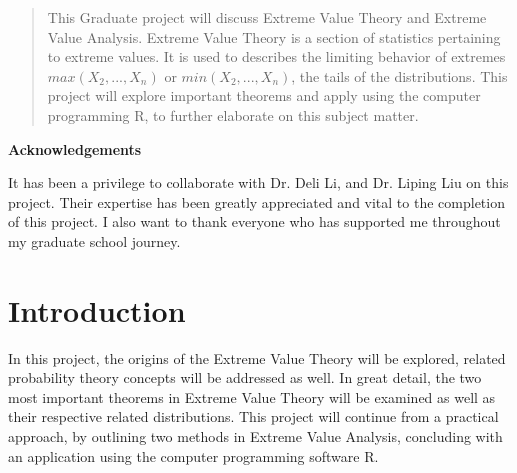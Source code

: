 \documentclass[11pt,a4paper]{article}
\theoremstyle{plain}
\begin{document}


\newpage

\begin{abstract}

This Graduate project will discuss Extreme Value Theory and Extreme Value Analysis. Extreme Value Theory is a section of statistics pertaining to extreme values. It is used to describes the limiting behavior of extremes $max(X_2,...,X_n)$ or $min(X_2,...,X_n)$, the tails of the distributions. This project will explore important theorems and apply using the computer programming R, to further elaborate on this subject matter.  
\end{abstract}

\newpage

\centerline{\bf Acknowledgements} \bigskip
It has been a privilege to collaborate with  Dr. Deli Li, and Dr. Liping Liu on this project. Their expertise has been greatly appreciated and vital to the completion of this project. I also want to thank everyone who has supported me throughout my graduate school journey.  

\newpage 

\tableofcontents

\newpage
\section{Introduction}
In this project, the origins of the Extreme Value Theory will be explored, related probability theory concepts will be addressed as well. In great detail, the two most important theorems in Extreme Value Theory will be examined as well as their respective related distributions. This project will continue from a practical approach, by outlining two methods in Extreme Value Analysis, concluding with an application using the computer programming software R.
\end{document}
